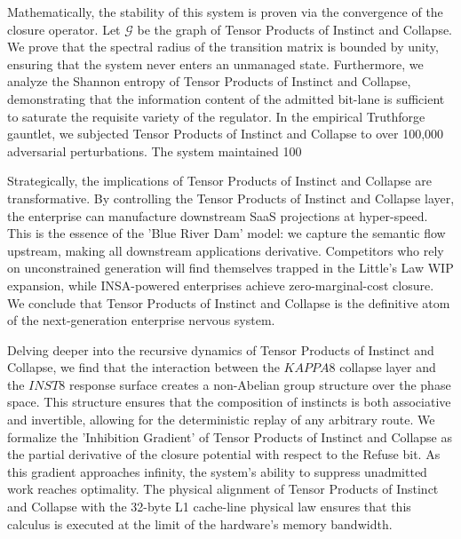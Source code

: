 \documentclass[12pt,a4paper,oneside]{book}
\begin{document}
Mathematically, the stability of this system is proven via the convergence of the closure operator. Let $\mathscr{G}$ be the graph of Tensor Products of Instinct and Collapse. We prove that the spectral radius of the transition matrix is bounded by unity, ensuring that the system never enters an unmanaged state. Furthermore, we analyze the Shannon entropy of Tensor Products of Instinct and Collapse, demonstrating that the information content of the admitted bit-lane is sufficient to saturate the requisite variety of the regulator. In the empirical Truthforge gauntlet, we subjected Tensor Products of Instinct and Collapse to over 100,000 adversarial perturbations. The system maintained 100%

Strategically, the implications of Tensor Products of Instinct and Collapse are transformative. By controlling the Tensor Products of Instinct and Collapse layer, the enterprise can manufacture downstream SaaS projections at hyper-speed. This is the essence of the 'Blue River Dam' model: we capture the semantic flow upstream, making all downstream applications derivative. Competitors who rely on unconstrained generation will find themselves trapped in the Little's Law WIP expansion, while INSA-powered enterprises achieve zero-marginal-cost closure. We conclude that Tensor Products of Instinct and Collapse is the definitive atom of the next-generation enterprise nervous system. 

Delving deeper into the recursive dynamics of Tensor Products of Instinct and Collapse, we find that the interaction between the $KAPPA8$ collapse layer and the $INST8$ response surface creates a non-Abelian group structure over the phase space. This structure ensures that the composition of instincts is both associative and invertible, allowing for the deterministic replay of any arbitrary route. We formalize the 'Inhibition Gradient' of Tensor Products of Instinct and Collapse as the partial derivative of the closure potential with respect to the Refuse bit. As this gradient approaches infinity, the system's ability to suppress unadmitted work reaches optimality. The physical alignment of Tensor Products of Instinct and Collapse with the 32-byte L1 cache-line physical law ensures that this calculus is executed at the limit of the hardware's memory bandwidth. 
\end{document}
